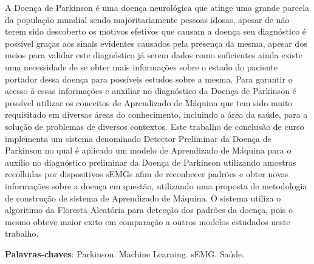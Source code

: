 \begin{resumo}
    A Doença de Parkinson é uma doença neurológica que atinge uma grande parcela da população mundial sendo majoritariamente pessoas idosas, apesar de não terem sido descoberto os motivos efetivos que causam a doença seu diagnóstico é possível graças aos sinais evidentes causados pela presença da mesma, apesar dos meios para validar este diagnóstico já serem dados como suficientes ainda existe uma necessidade de se obter mais informações sobre o estado do paciente portador dessa doença para possíveis estudos sobre a mesma. Para garantir o acesso à essas informações e auxiliar no diagnóstico da Doença de Parkinson é possível utilizar os conceitos de Aprendizado de Máquina que tem sido muito requisitado em diversas áreas do conhecimento, incluindo a área da saúde, para a solução de problemas de diversos contextos. Este trabalho de conclusão de curso implementa um sistema denominado Detector Preliminar da Doença de Parkinson no qual é aplicado um modelo de Aprendizado de Máquina para o auxílio no diagnóstico preliminar da Doença de Parkinson utilizando amostras recolhidas por dispositivos sEMGs afim de reconhecer padrões e obter novas informações sobre a doença em questão, utilizando uma proposta de metodologia de construção de sistema de Aprendizado de Máquina. O sistema utiliza o algoritimo da Floresta Aleatória para detecção dos padrões da doença, pois o mesmo obteve maior exito em comparação a outros modelos estudados neste trabalho.

 \vspace{\onelineskip}
    
 \noindent
 \textbf{Palavras-chaves}: Parkinson. Machine Learning. sEMG. Saúde.
\end{resumo}
